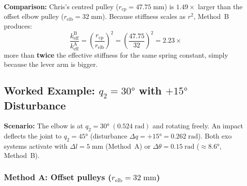 \documentclass[11pt, a4paper]{article}
\begin{document}
\begin{mdframed}
\textbf{Comparison:} Chris's centred pulley ($r_{\text{cp}} = 47.75\;\text{mm}$) is
$1.49\times$ larger than the offset elbow pulley ($r_{\text{elb}} = 32\;\text{mm}$).
Because stiffness scales as $r^2$, Method~B produces:
\[
    \frac{k_{\text{eff}}^{\text{B}}}{k_{\text{eff}}^{\text{A}}}
    = \left(\frac{r_{\text{cp}}}{r_{\text{elb}}}\right)^{\!2}
    = \left(\frac{47.75}{32}\right)^{\!2}
    = 2.23 \times
\]
more than \textbf{twice} the effective stiffness for the same spring
constant, simply because the lever arm is bigger.
\end{mdframed}

\subsection{Worked Example: $q_2 = 30°$ with $+15°$ Disturbance}
\label{sec:worked-both}

\noindent
\textbf{Scenario:} The elbow is at $q_2 = 30°\;(0.524\;\text{rad})$ and
rotating freely.  An impact deflects the joint to $q_2 = 45°$ (disturbance
$\Delta q = +15° = 0.262\;\text{rad}$).  Both exo systems activate with
$\Delta l = 5\;\text{mm}$ (Method~A) or $\Delta\theta = 0.15\;\text{rad}$
($\approx 8.6°$, Method~B).

\subsubsection{Method A: Offset pulleys ($r_{\text{elb}} = 32\;\text{mm}$)}
\end{document}
